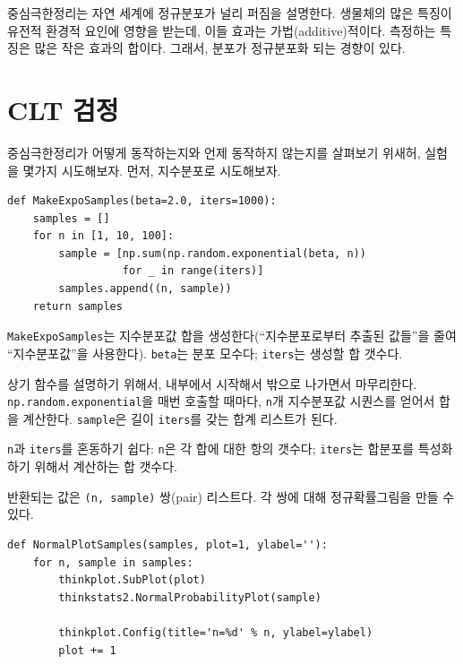 중심극한정리는 자연 세계에 정규분포가 널리 퍼짐을 설명한다.
생물체의 많은 특징이 유전적 환경적 요인에 영향을 받는데, 이들 효과는 가법(additive)적이다. 측정하는 특징은 많은 작은 효과의 합이다. 그래서, 분포가 정규분포화 되는 경향이 있다.



\section{CLT 검정}

중심극한정리가 어떻게 동작하는지와 언제 동작하지 않는지를 살펴보기 위새허, 실험을 몇가지 시도해보자. 먼저, 지수분포로 시도해보자.

\begin{verbatim}
def MakeExpoSamples(beta=2.0, iters=1000):
    samples = []
    for n in [1, 10, 100]:
        sample = [np.sum(np.random.exponential(beta, n))
                  for _ in range(iters)]
        samples.append((n, sample))
    return samples
\end{verbatim}


{\tt MakeExpoSamples}는 지수분포값 합을 생성한다(``지수분포로부터 추출된 값들''을 줄여 ``지수분포값''을 사용한다).
{\tt beta}는 분포 모수다; {\tt iters}는 생성할 합 갯수다.

상기 함수를 설명하기 위해서, 내부에서 시작해서 밖으로 나가면서 마무리한다.
{\tt np.random.exponential}을 매번 호출할 때마다, {\tt n}개 지수분포값 시퀀스를 얻어서 합을 계산한다. {\tt sample}은 길이 {\tt iters}를 갖는 합계 리스트가 된다.

{\tt n}과 {\tt iters}를 혼동하기 쉽다: {\tt n}은 각 합에 대한 항의 갯수다; {\tt iters}는 합분포를 특성화하기 위해서 계산하는 합 갯수다.

반환되는 값은 {\tt (n, sample)} 쌍(pair) 리스트다. 각 쌍에 대해 정규확률그림을 만들 수 있다.

\begin{verbatim}
def NormalPlotSamples(samples, plot=1, ylabel=''):
    for n, sample in samples:
        thinkplot.SubPlot(plot)
        thinkstats2.NormalProbabilityPlot(sample)

        thinkplot.Config(title='n=%d' % n, ylabel=ylabel)
        plot += 1
\end{verbatim}

